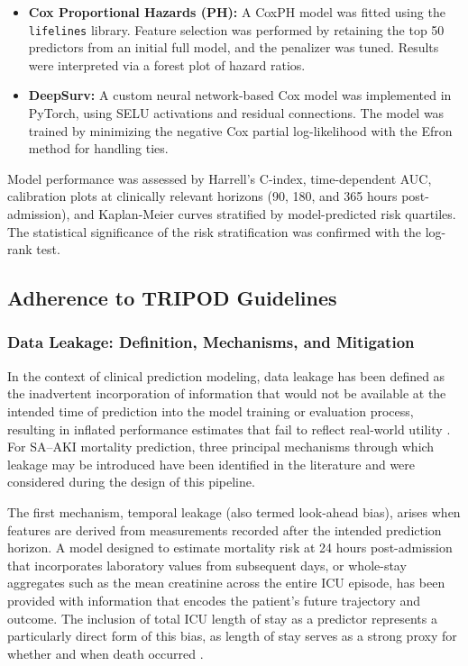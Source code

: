 \begin{itemize}
    \item \textbf{Cox Proportional Hazards (PH):} A CoxPH model was fitted using the \texttt{lifelines} library. Feature selection was performed by retaining the top 50 predictors from an initial full model, and the penalizer was tuned. Results were interpreted via a forest plot of hazard ratios.
    \item \textbf{DeepSurv:} A custom neural network-based Cox model was implemented in PyTorch, using SELU activations and residual connections. The model was trained by minimizing the negative Cox partial log-likelihood with the Efron method for handling ties.
\end{itemize}
Model performance was assessed by Harrell's C-index, time-dependent AUC, calibration plots at clinically relevant horizons (90, 180, and 365 hours post-admission), and Kaplan-Meier curves stratified by model-predicted risk quartiles. The statistical significance of the risk stratification was confirmed with the log-rank test.

\subsection{Adherence to TRIPOD Guidelines}

\subsubsection{Data Leakage: Definition, Mechanisms, and Mitigation}
In the context of clinical prediction modeling, data leakage has been defined as the inadvertent incorporation of information that would not be available at the intended time of prediction into the model training or evaluation process, resulting in inflated performance estimates that fail to reflect real-world utility \citep{Kang_Yoon_2023}. For SA--AKI mortality prediction, three principal mechanisms through which leakage may be introduced have been identified in the literature and were considered during the design of this pipeline.

The first mechanism, temporal leakage (also termed look-ahead bias), arises when features are derived from measurements recorded after the intended prediction horizon. A model designed to estimate mortality risk at 24 hours post-admission that incorporates laboratory values from subsequent days, or whole-stay aggregates such as the mean creatinine across the entire ICU episode, has been provided with information that encodes the patient's future trajectory and outcome. The inclusion of total ICU length of stay as a predictor represents a particularly direct form of this bias, as length of stay serves as a strong proxy for whether and when death occurred \citep{Chen_2025}.

